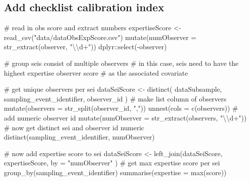 \documentclass[]{article}
\newenvironment{Shaded}{}{}
\newcommand{\CharTok}[1]{\textcolor[rgb]{0.00,0.50,0.50}{#1}}
\newcommand{\CommentTok}[1]{\textcolor[rgb]{0.00,0.50,0.00}{#1}}
\newcommand{\DataTypeTok}[1]{#1}
\newcommand{\KeywordTok}[1]{\textcolor[rgb]{0.00,0.00,1.00}{#1}}
\newcommand{\NormalTok}[1]{#1}
\newcommand{\OperatorTok}[1]{#1}
\newcommand{\StringTok}[1]{\textcolor[rgb]{0.00,0.50,0.50}{#1}}
\begin{document}
\hypertarget{add-checklist-calibration-index}{%
\subsection{Add checklist calibration index}\label{add-checklist-calibration-index}}

\begin{Shaded}
\begin{Highlighting}[]
\CommentTok{# read in obs score and extract numbers}
\NormalTok{expertiseScore <-}\StringTok{ }\KeywordTok{read_csv}\NormalTok{(}\StringTok{"data/dataObsExpScore.csv"}\NormalTok{) }\OperatorTok{%
\StringTok{  }\KeywordTok{mutate}\NormalTok{(}\DataTypeTok{numObserver =} \KeywordTok{str_extract}\NormalTok{(observer, }\StringTok{"}\CharTok{\textbackslash{}\textbackslash{}}\StringTok{d+"}\NormalTok{)) }\OperatorTok{%
\StringTok{  }\NormalTok{dplyr}\OperatorTok{::}\KeywordTok{select}\NormalTok{(}\OperatorTok{-}\NormalTok{observer)}

\CommentTok{# group seis consist of multiple observers}
\CommentTok{# in this case, seis need to have the highest expertise observer score}
\CommentTok{# as the associated covariate}

\CommentTok{# get unique observers per sei}
\NormalTok{dataSeiScore <-}\StringTok{ }\KeywordTok{distinct}\NormalTok{(}
\NormalTok{  dataSubsample, sampling_event_identifier,}
\NormalTok{  observer_id}
\NormalTok{) }\OperatorTok{%
\StringTok{  }\CommentTok{# make list column of observers}
\StringTok{  }\KeywordTok{mutate}\NormalTok{(}\DataTypeTok{observers =} \KeywordTok{str_split}\NormalTok{(observer_id, }\StringTok{","}\NormalTok{)) }\OperatorTok{%
\StringTok{  }\KeywordTok{unnest}\NormalTok{(}\DataTypeTok{cols =} \KeywordTok{c}\NormalTok{(observers)) }\OperatorTok{%
\StringTok{  }\CommentTok{# add numeric observer id}
\StringTok{  }\KeywordTok{mutate}\NormalTok{(}\DataTypeTok{numObserver =} \KeywordTok{str_extract}\NormalTok{(observers, }\StringTok{"}\CharTok{\textbackslash{}\textbackslash{}}\StringTok{d+"}\NormalTok{)) }\OperatorTok{%
\StringTok{  }\CommentTok{# now get distinct sei and observer id numeric}
\StringTok{  }\KeywordTok{distinct}\NormalTok{(sampling_event_identifier, numObserver)}

\CommentTok{# now add expertise score to sei}
\NormalTok{dataSeiScore <-}\StringTok{ }\KeywordTok{left_join}\NormalTok{(dataSeiScore, expertiseScore,}
  \DataTypeTok{by =} \StringTok{"numObserver"}
\NormalTok{) }\OperatorTok{%
\StringTok{  }\CommentTok{# get max expertise score per sei}
\StringTok{  }\KeywordTok{group_by}\NormalTok{(sampling_event_identifier) }\OperatorTok{%
\StringTok{  }\KeywordTok{summarise}\NormalTok{(}\DataTypeTok{expertise =} \KeywordTok{max}\NormalTok{(score))}

}}}}}}}}
\end{Highlighting}
\end{Shaded}
\end{document}
